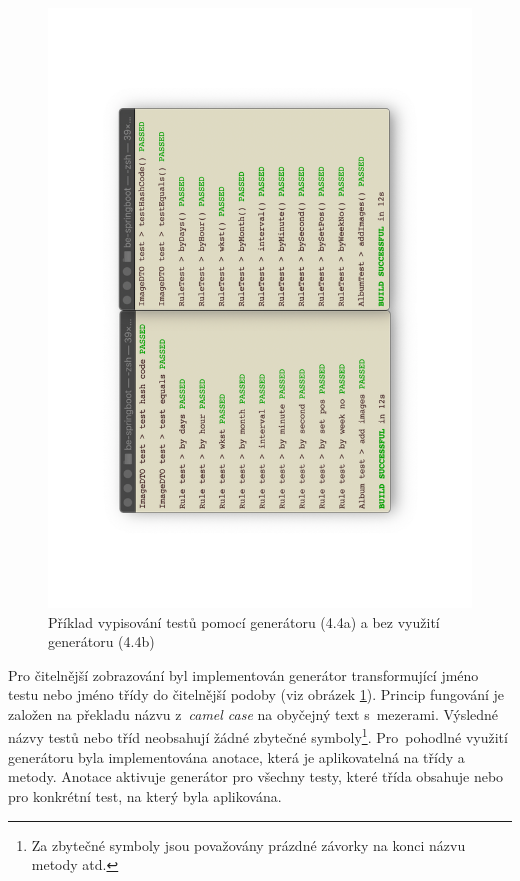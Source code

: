     \begin{figure}\centering
	   \includegraphics[angle=-90, width=1.0\textwidth]{pdfs/pretty-tests-comparison}
	   \caption[Srovnaní zobrazováni kódu]{Příklad vypisování testů pomocí generátoru (4.4a) a bez využití generátoru (4.4b)}\label{image:pretty-tests-comparison}
    \end{figure}
    Pro čitelnější zobrazování byl implementován generátor transformující jméno testu nebo jméno třídy do čitelnější podoby (viz obrázek \ref{image:pretty-tests-comparison}). Princip fungování je založen na překladu názvu z~\textit{camel case} na obyčejný text s~mezerami. Výsledné názvy testů nebo tříd neobsahují žádné zbytečné symboly\footnote{Za zbytečné symboly jsou považovány prázdné závorky na konci názvu metody atd.}. Pro~pohodlné využití generátoru byla implementována anotace, která je aplikovatelná na třídy a metody. Anotace aktivuje generátor pro všechny testy, které třída obsahuje nebo pro konkrétní test, na který byla aplikována.
    
